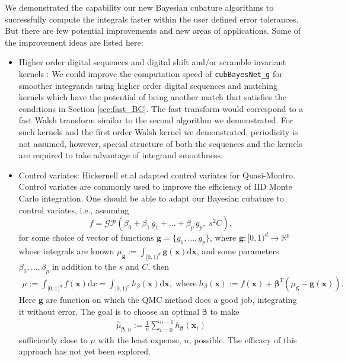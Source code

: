 \documentclass{iitthesis}          %
\newcommand{\bm}[1]{\boldsymbol{#1}}
\newcommand{\dif}[1]{\text{d}{#1}}
\newcommand{\reals}{\mathbb{R}}
\newcommand{\vbeta}{{\bm{\beta}}}
\newcommand{\vg}{\bm{g}}
\newcommand{\vx}{\bm{x}}
\newcommand{\dx}{\dif{{x}}}
\newcommand{\dvx}{\dif{\bm{x}}}
\newcommand{\code}[1]{\texttt{#1}}
\begin{document}
{{{{{{

We demonstrated the capability our new Bayesian cubature algorithms to successfully compute the integrals faster within the user defined error tolerances. But there are few potential improvements and new areas of applications.
Some of the improvement ideas are listed here:
\begin{itemize}
\item Higher order digital sequences and digital shift and/or scramble invariant kernels \cite{Nuyens2013} \cite{Bald12a}:
We could improve the computation speed of \code{cubBayesNet\_g} for smoother integrands using higher order digital sequences and matching kernels which have the potential of being another match that satisfies the conditions in Section \ref{sec:fast_BC}.  The fast transform would correspond to a fast Walsh transform similar to the second algorithm we demonstrated.  For such kernels and the first order Walsh kernel we demonstrated, periodicity is not assumed, however, special structure of both the sequences and the kernels are required to take advantage of integrand smoothness.

\item Control variates:
Hickernell et.al \cite{HicEtal17a} \cite{Li16a} adapted control variates for Quasi-Montro. 
Control variates are commonly used to improve the efficiency of IID Monte Carlo integration.
One should be able to adapt our Bayesian cubature to control variates, i.e., assuming  
\begin{equation*}
f = \mathcal{GP} \left( \beta_0 + \beta_1 \, g_1 + \dots + \beta_p \, g_p, \;s^2 C \right),
\end{equation*}
for some choice of vector of functions $\vg = \{g_1, \ldots, g_p\}$, where $\vg : [0,1)^d \to \reals^p$ whose integrals are known $\mu_{\vg} := \int_{[0,1)^d} \vg(\vx)\dvx$, and some parameters $\beta_0, \ldots, \beta_p$ in addition to the $s$ and $C$, then
\begin{align*}
\mu :=
\int_{[0,1)^d} f(\vx) \dx =
\int_{[0,1)^d} h_{\beta} (\vx) \dvx,  \; \text{where} \;
h_{\beta}(\vx) := f(\vx) + \vbeta^T
(\mu_{\vg} - \vg(\vx)).
\end{align*}
Here $\vg$ are function on which the QMC method does a good job, integrating it without error. 
The goal is to choose an optimal $\vbeta$ to make
\begin{align*}
\widehat{\mu}_{\vbeta,n} :=
\frac 1n \sum_{i=0}^{n-1} h_{\vbeta} (\vx_i)
\end{align*}
sufficiently close to $\mu$ with the least expense, $n$, possible.
The efficacy of this approach has not yet been explored.











\end{itemize}}}}}}}
\end{document}
